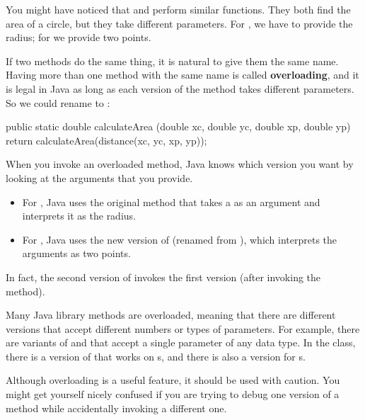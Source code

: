 You might have noticed that  and  perform similar functions.
They both find the area of a circle, but they take different parameters.
For , we have to provide the radius; for  we provide two points.


If two methods do the same thing, it is natural to give them the same name.
Having more than one method with the same name is called {\bf overloading}, and it is legal in Java as long as each version of the method takes different parameters.
So we could rename  to :

\begin{code}
public static double calculateArea
        (double xc, double yc, double xp, double yp) {
    return calculateArea(distance(xc, yc, xp, yp));
}
\end{code}

When you invoke an overloaded method, Java knows which version you want by looking at the arguments that you provide.

\begin{itemize}

\item For , Java uses the original  method that takes a  as an argument and interprets it as the radius.

\item For , Java uses the new version of  (renamed from ), which interprets the arguments as two points.

\end{itemize}

In fact, the second version of  invokes the first version (after invoking the  method).

Many Java library methods are overloaded, meaning that there are different versions that accept different numbers or types of parameters.
For example, there are variants of  and  that accept a single parameter of any data type.
In the  class, there is a version of  that works on s, and there is also a version for s.

Although overloading is a useful feature, it should be used with caution.
You might get yourself nicely confused if you are trying to debug one version of a method while accidentally invoking a different one.


